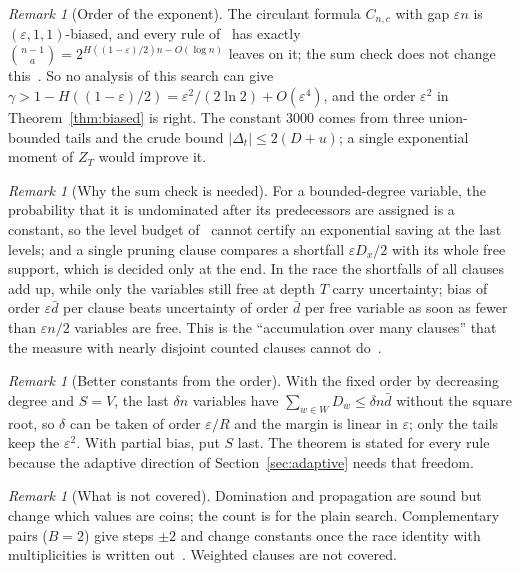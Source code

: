 \documentclass[11pt,a4paper]{article}
\theoremstyle{definition}
\theoremstyle{remark}
\newtheorem{remark}[theorem]{Remark}
\begin{document}
\begin{remark}[Order of the exponent]\label{rem:tight}
The circulant formula $C_{n,c}$ with gap $\varepsilon n$ is
$(\varepsilon,1,1)$-biased, and every rule of~\cite{N3} has exactly
$\binom{n-1}{a}=2^{H((1-\varepsilon)/2)n-O(\log n)}$ leaves on it; the sum
check does not change this~\cite[Section~5]{N4}. So no analysis of this search
can give $\gamma>1-H((1-\varepsilon)/2)=\varepsilon^2/(2\ln2)+O(\varepsilon^4)$,
and the order $\varepsilon^2$ in Theorem~\ref{thm:biased} is right. The
constant $3000$ comes from three union-bounded tails and the crude bound
$|\Delta_t|\le2(D+u)$; a single exponential moment of $Z_T$ would improve it.
\end{remark}

\begin{remark}[Why the sum check is needed]
For a bounded-degree variable, the probability that it is undominated after
its predecessors are assigned is a constant, so the level budget of~\cite{N3}
cannot certify an exponential saving at the last levels; and a single pruning
clause compares a shortfall $\varepsilon D_x/2$ with its whole free support,
which is decided only at the end. In the race the shortfalls of all clauses add
up, while only the variables still free at depth $T$ carry uncertainty; bias
of order $\varepsilon\bar d$ per clause beats uncertainty of order $\bar d$ per
free variable as soon as fewer than $\varepsilon n/2$ variables are free. This
is the ``accumulation over many clauses'' that the measure with nearly disjoint
counted clauses cannot do~\cite[Remark~12]{N4}.
\end{remark}

\begin{remark}[Better constants from the order]
With the fixed order by decreasing degree and $S=V$, the last $\delta n$
variables have $\sum_{w\in W}D_w\le\delta n\bar d$ without the square root, so
$\delta$ can be taken of order $\varepsilon/R$ and the margin is linear in
$\varepsilon$; only the tails keep the $\varepsilon^2$. With partial bias, put
$S$ last. The theorem is stated for every rule because the adaptive direction
of Section~\ref{sec:adaptive} needs that freedom.
\end{remark}

\begin{remark}[What is not covered]
Domination and propagation are sound but change which values are coins; the
count is for the plain search. Complementary pairs ($B=2$) give steps $\pm2$
and change constants once the race identity with multiplicities is written
out~\cite[Section~4]{N9}. Weighted clauses are not covered.
\end{remark}
\end{document}
